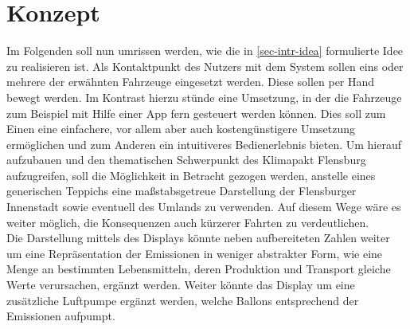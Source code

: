 \documentclass[.../Dokumentation.tex]{subfiles}
\begin{document}
\section{Konzept}\label{sec-concept}
Im Folgenden soll nun umrissen werden, wie die in \ref{sec-intr-idea} 
formulierte Idee zu realisieren ist.
Als Kontaktpunkt des Nutzers mit dem System sollen eins oder mehrere 
der erwähnten Fahrzeuge eingesetzt werden. Diese sollen per Hand bewegt werden. 
Im Kontrast hierzu stünde eine Umsetzung, in der die Fahrzeuge zum Beispiel mit 
Hilfe einer App fern gesteuert werden können.
Dies soll zum Einen eine einfachere, vor allem aber auch kostengünstigere 
Umsetzung ermöglichen und zum Anderen ein intuitiveres Bedienerlebnis bieten.
Um hierauf aufzubauen und den thematischen Schwerpunkt des Klimapakt Flensburg 
aufzugreifen, soll die Möglichkeit in Betracht gezogen werden, anstelle 
eines generischen Teppichs eine maßstabsgetreue Darstellung der Flensburger 
Innenstadt sowie eventuell des Umlands zu verwenden.
Auf diesem Wege wäre es weiter möglich, die Konsequenzen auch kürzerer Fahrten 
zu verdeutlichen.\\
Die Darstellung mittels des Displays könnte neben aufbereiteten Zahlen weiter 
um eine Repräsentation der Emissionen in weniger abstrakter Form, wie eine 
Menge an bestimmten Lebensmitteln, deren Produktion und Transport gleiche Werte 
verursachen, ergänzt werden.
Weiter könnte das Display um eine zusätzliche Luftpumpe ergänzt werden, 
welche Ballons entsprechend der Emissionen aufpumpt.
\end{document}
